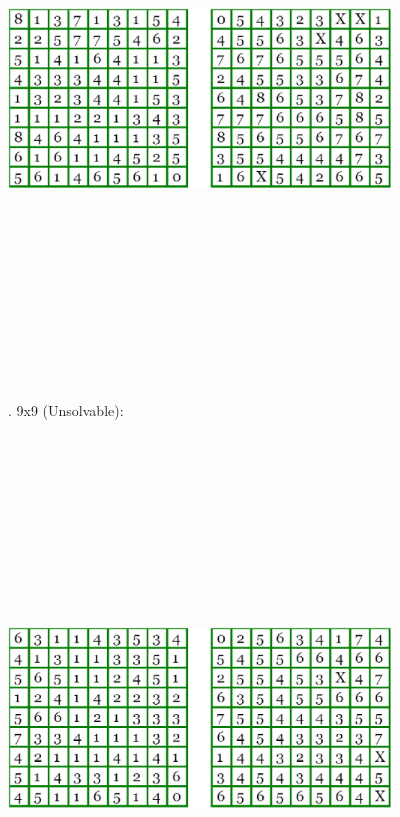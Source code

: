\documentclass[12pt, letterpaper]{article}
\begin{document}
\includegraphics[width=4in, height=15cm, keepaspectratio]{"Task 2/9x9 Puzzle (Solvable)"}
	
\bigskip
{}. 9x9 (Unsolvable):
	
\includegraphics[width=4in, height=15cm, keepaspectratio]{"Task 2/9x9 Puzzle (Unsolvable)"}
\end{document}
